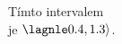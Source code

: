 \documentclass[preview]{standalone}
\begin{document}
\begin{center}
Tímto intervalem\\ je  $\lagnle 0.4,1.3 \rangle$.
\end{center}
\end{document}
